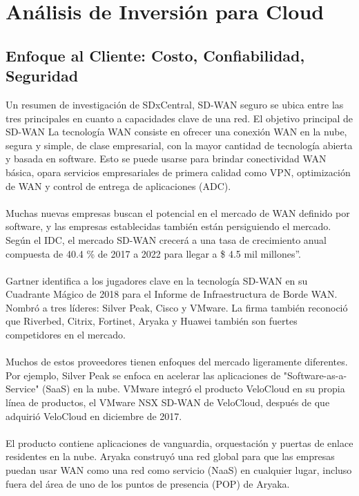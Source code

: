 \section{Análisis de Inversión para Cloud} %
\label{sec:Análisis de Inversión para Cloud}

\subsection{Enfoque al Cliente: Costo, Confiabilidad, Seguridad}
\label{sec:Enfoque al cliente: costo, confiabilidad, seguridad}

Un resumen de investigación de SDxCentral, SD-WAN seguro se ubica entre las tres principales en cuanto a capacidades clave de una red.
El objetivo principal de SD-WAN La tecnología WAN consiste en ofrecer una conexión WAN en la nube, segura y simple, de clase empresarial, con la mayor cantidad de tecnología abierta y basada en software.
Esto se puede usarse para brindar conectividad WAN básica, opara servicios empresariales de primera calidad como VPN, optimización de WAN y control de entrega de aplicaciones (ADC).
\\
\\
Muchas nuevas empresas buscan el potencial en el mercado de WAN definido por software, y las empresas establecidas también están persiguiendo el mercado. Según el IDC, el mercado SD-WAN crecerá a una tasa de crecimiento anual compuesta de 40.4 \% de 2017 a 2022 para llegar a \$ 4.5 mil millones”.
\\
\\
Gartner identifica a los jugadores clave en la tecnología SD-WAN en su Cuadrante Mágico de 2018 para el Informe de Infraestructura de Borde WAN. Nombró a tres líderes: Silver Peak, Cisco y VMware. La firma también reconoció que Riverbed, Citrix, Fortinet, Aryaka y Huawei también son fuertes competidores en el mercado.
\\
\\
Muchos de estos proveedores tienen enfoques del mercado ligeramente diferentes. Por ejemplo, Silver Peak se enfoca en acelerar las aplicaciones de "Software-as-a-Service" (SaaS) en la nube. VMware integró el producto VeloCloud en su propia línea de productos, el VMware NSX SD-WAN de VeloCloud, después de que adquirió VeloCloud
en diciembre de 2017.
\\
\\
El producto contiene aplicaciones de vanguardia, orquestación y puertas de enlace residentes en la nube. Aryaka construyó una red global para que las empresas puedan usar WAN como una red como servicio (NaaS) en cualquier lugar, incluso fuera del área de uno de los puntos de presencia (POP) de Aryaka.
